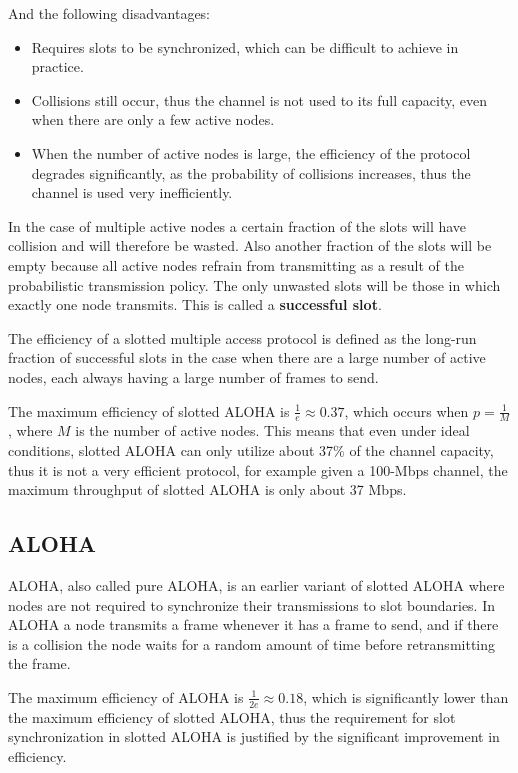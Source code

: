 \documentclass[12pt letter]{report}
\begin{document}
And the following disadvantages:
\begin{itemize}
  \item Requires slots to be synchronized, which can be difficult to
    achieve in practice.
  \item Collisions still occur, thus the channel is not used to its full
    capacity, even when there are only a few active nodes.
  \item When the number of active nodes is large, the efficiency of the
    protocol degrades significantly, as the probability of collisions
    increases, thus the channel is used very inefficiently.
\end{itemize}

In the case of multiple active nodes a certain fraction of the slots
will have collision and will therefore be wasted. Also another
fraction of the slots will be empty because all active nodes refrain
from transmitting as a result of the probabilistic transmission
policy. The only unwasted slots will be those in which exactly one
node transmits. This is called a \textbf{successful slot}.

The efficiency of a slotted multiple access protocol is defined as
the long-run fraction of successful slots in the case when there are
a large number of active nodes, each always having a large number of
frames to send.

The maximum efficiency of slotted ALOHA is $\frac{1}{e} \approx
0.37$, which occurs when $p = \frac{1}{M}$, where $M$ is the number
of active nodes. This means that even under ideal conditions, slotted
ALOHA can only
utilize about 37\% of the channel capacity, thus it is not a very
efficient protocol, for example given a 100-Mbps channel, the maximum
throughput of slotted ALOHA is only about 37 Mbps.

\subsection{ALOHA}

ALOHA, also called pure ALOHA, is an earlier variant of slotted ALOHA
where nodes are not required to synchronize their transmissions to
slot boundaries. In ALOHA a node transmits a frame whenever it has a
frame to send, and if there is a collision the node waits for a
random amount of time before retransmitting the frame.

The maximum efficiency of ALOHA is $\frac{1}{2e} \approx 0.18$, which
is significantly lower than the maximum efficiency of slotted ALOHA,
thus the requirement for slot synchronization
in slotted ALOHA is justified by the significant improvement in efficiency.
\end{document}
